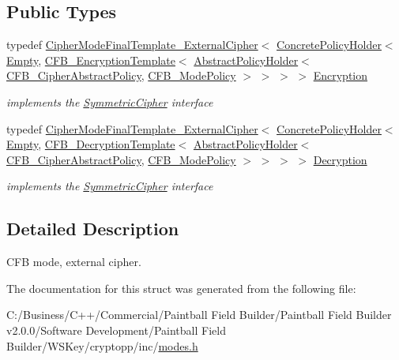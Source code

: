 \subsection*{Public Types}
\begin{DoxyCompactItemize}
\item 
\hypertarget{struct_c_f_b___mode___external_cipher_a7813692f6a4c0af1ef2eeeccf0c0d1aa}{
typedef \hyperlink{class_cipher_mode_final_template___external_cipher}{CipherModeFinalTemplate\_\-ExternalCipher}$<$ \hyperlink{class_concrete_policy_holder}{ConcretePolicyHolder}$<$ \hyperlink{class_empty}{Empty}, \hyperlink{class_c_f_b___encryption_template}{CFB\_\-EncryptionTemplate}$<$ \hyperlink{class_abstract_policy_holder}{AbstractPolicyHolder}$<$ \hyperlink{class_c_f_b___cipher_abstract_policy}{CFB\_\-CipherAbstractPolicy}, \hyperlink{class_c_f_b___mode_policy}{CFB\_\-ModePolicy} $>$ $>$ $>$ $>$ \hyperlink{struct_c_f_b___mode___external_cipher_a7813692f6a4c0af1ef2eeeccf0c0d1aa}{Encryption}}
\label{struct_c_f_b___mode___external_cipher_a7813692f6a4c0af1ef2eeeccf0c0d1aa}

\begin{DoxyCompactList}\small\item\em implements the \hyperlink{class_symmetric_cipher}{SymmetricCipher} interface \item\end{DoxyCompactList}\item 
\hypertarget{struct_c_f_b___mode___external_cipher_a3eaabeb1e794d26b41ddaba2423fa85e}{
typedef \hyperlink{class_cipher_mode_final_template___external_cipher}{CipherModeFinalTemplate\_\-ExternalCipher}$<$ \hyperlink{class_concrete_policy_holder}{ConcretePolicyHolder}$<$ \hyperlink{class_empty}{Empty}, \hyperlink{class_c_f_b___decryption_template}{CFB\_\-DecryptionTemplate}$<$ \hyperlink{class_abstract_policy_holder}{AbstractPolicyHolder}$<$ \hyperlink{class_c_f_b___cipher_abstract_policy}{CFB\_\-CipherAbstractPolicy}, \hyperlink{class_c_f_b___mode_policy}{CFB\_\-ModePolicy} $>$ $>$ $>$ $>$ \hyperlink{struct_c_f_b___mode___external_cipher_a3eaabeb1e794d26b41ddaba2423fa85e}{Decryption}}
\label{struct_c_f_b___mode___external_cipher_a3eaabeb1e794d26b41ddaba2423fa85e}

\begin{DoxyCompactList}\small\item\em implements the \hyperlink{class_symmetric_cipher}{SymmetricCipher} interface \item\end{DoxyCompactList}\end{DoxyCompactItemize}


\subsection{Detailed Description}
CFB mode, external cipher. 

The documentation for this struct was generated from the following file:\begin{DoxyCompactItemize}
\item 
C:/Business/C++/Commercial/Paintball Field Builder/Paintball Field Builder v2.0.0/Software Development/Paintball Field Builder/WSKey/cryptopp/inc/\hyperlink{modes_8h}{modes.h}\end{DoxyCompactItemize}
